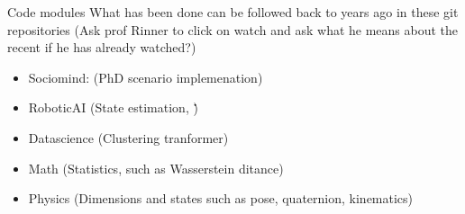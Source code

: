 \begin{frame}[allowframebreaks]{Code modules}
    What has been done can be followed back to years ago in these git repositories
    (Ask prof Rinner to click on watch and ask what he means about the recent if he has already watched?)
    \begin{itemize}
        \item Sociomind: (PhD scenario implemenation)
        \item RoboticAI (State estimation, \.\.\.)
        \item Datascience (Clustering tranformer)
        \item Math (Statistics, such as Wasserstein ditance)
        \item Physics (Dimensions and states such as pose, quaternion, kinematics)
    \end{itemize}
\end{frame}